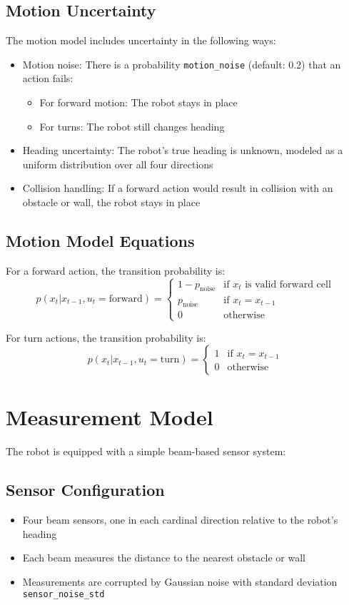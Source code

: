 \documentclass[11pt]{article}
\begin{document}
\subsection{Motion Uncertainty}
The motion model includes uncertainty in the following ways:
\begin{itemize}
    \item Motion noise: There is a probability \texttt{motion\_noise} (default: 0.2) that an action fails:
        \begin{itemize}
            \item For forward motion: The robot stays in place
            \item For turns: The robot still changes heading
        \end{itemize}
    \item Heading uncertainty: The robot's true heading is unknown, modeled as a uniform distribution over all four directions
    \item Collision handling: If a forward action would result in collision with an obstacle or wall, the robot stays in place
\end{itemize}

\subsection{Motion Model Equations}
For a forward action, the transition probability is:
\[
p(x_t|x_{t-1}, u_t=\text{forward}) = \begin{cases}
1-p_{\text{noise}} & \text{if } x_t \text{ is valid forward cell} \\
p_{\text{noise}} & \text{if } x_t = x_{t-1} \\
0 & \text{otherwise}
\end{cases}
\]

For turn actions, the transition probability is:
\[
p(x_t|x_{t-1}, u_t=\text{turn}) = \begin{cases}
1 & \text{if } x_t = x_{t-1} \\
0 & \text{otherwise}
\end{cases}
\]

\section{Measurement Model}
The robot is equipped with a simple beam-based sensor system:

\subsection{Sensor Configuration}
\begin{itemize}
    \item Four beam sensors, one in each cardinal direction relative to the robot's heading
    \item Each beam measures the distance to the nearest obstacle or wall
    \item Measurements are corrupted by Gaussian noise with standard deviation \texttt{sensor\_noise\_std}
\end{itemize}
\end{document}
